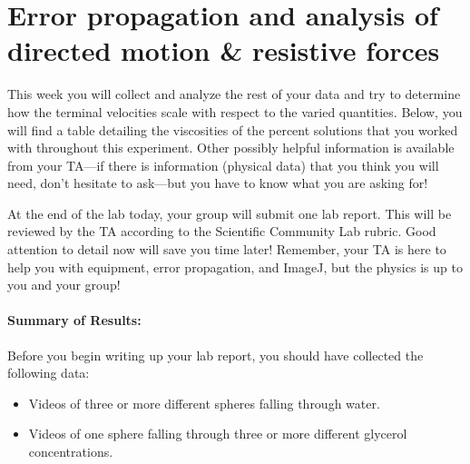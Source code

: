\section{Error propagation and analysis of directed motion \& resistive forces}
This week you will collect and analyze the rest of your data and try to determine how the terminal velocities scale with respect to the varied quantities.
Below, you will find a table detailing the viscosities of the percent solutions that you worked with throughout this experiment.
Other possibly helpful information is available from your TA—if there is information (physical data) that you think you will need, don't hesitate to ask—but you have to know what you are asking for! \par
At the end of the lab today, your group will submit one lab report.
This will be reviewed by the TA according to the Scientific Community Lab rubric.
Good attention to detail now will save you time later!
Remember, your TA is here to help you with equipment, error propagation, and ImageJ, but the physics is up to you and your group!

\paragraph{Summary of Results:\\} 
Before you begin writing up your lab report, you should have collected the following data:
\begin{itemize}
\item Videos of three or more different spheres falling through water.
\item Videos of one sphere falling through three or more different glycerol concentrations.
\end{itemize}

